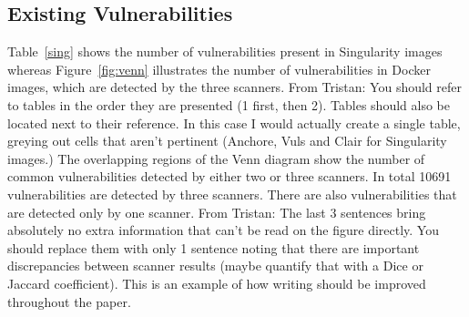 \documentclass[a4paper,num-refs]{oup-contemporary}
\newcommand{\tristan}[1]{\color{blue}From Tristan: #1\color{black}}
\begin{document}
\subsection{Existing Vulnerabilities}

Table~\ref{sing} shows the number of vulnerabilities present in Singularity
images whereas Figure~\ref{fig:venn} illustrates the number of
vulnerabilities in Docker images, which are detected by the three scanners.
\tristan{You should refer to tables in the order they are presented (1
first, then 2). Tables should also be located next to their reference. In
this case I would actually create a single table, greying out cells that
aren't pertinent (Anchore, Vuls and Clair for Singularity images.)}
 The
overlapping regions of the Venn diagram show the number of common vulnerabilities detected by either two or
three scanners. In total 10691 vulnerabilities are detected by three scanners.
There are also vulnerabilities that are detected only by one scanner. \tristan{The last 3 sentences bring absolutely no 
extra information that can't be read on the figure directly. You should replace them with only 1 sentence noting that there 
are important discrepancies between scanner results (maybe quantify that with a Dice or Jaccard coefficient). This is an example 
of how writing should be improved throughout the paper.}
\end{document}
